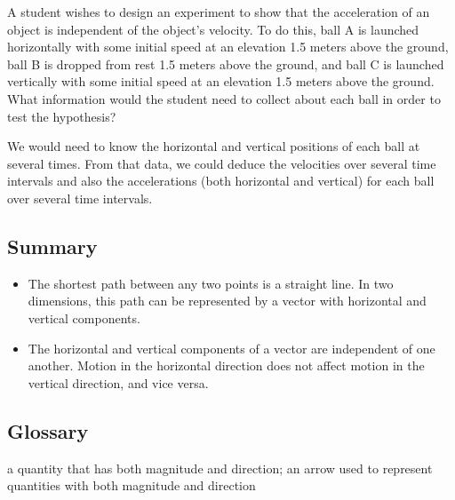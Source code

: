 \documentclass[
]{book}
\providecommand{\tightlist}{%
  \setlength{\itemsep}{0pt}\setlength{\parskip}{0pt}}
\newenvironment{ap-test-prep}{}{}
\begin{document}
\begin{ap-test-prep}
\hypertarget{fs-id1462671}{}
\leavevmode\hypertarget{fs-id2166894}{}%
A student wishes to design an experiment to show that the acceleration
of an object is independent of the object's velocity. To do this, ball
A is launched horizontally with some initial speed at an elevation 1.5
meters above the ground, ball B is dropped from rest 1.5 meters above
the ground, and ball C is launched vertically with some initial speed at
an elevation 1.5 meters above the ground. What information would the
student need to collect about each ball in order to test the hypothesis?

\leavevmode\hypertarget{fs-id1414446}{}%
We would need to know the horizontal and vertical positions of each ball
at several times. From that data, we could deduce the velocities over
several time intervals and also the accelerations (both horizontal and
vertical) for each ball over several time intervals.

\end{ap-test-prep}

\hypertarget{fs-id1165298944131-summary}{}
\hypertarget{summary}{%
\subsection{Summary}\label{summary}}

\begin{itemize}
\tightlist
\item
  \protect\hypertarget{import-auto-id1165296313373}{}{The shortest path between any two points is a straight line. In two
  dimensions, this path can be represented by a vector with horizontal
  and vertical components.}
\item
  \protect\hypertarget{import-auto-id1165296414067}{}{The horizontal and vertical components of a vector are independent
  of one another. Motion in the horizontal direction does not affect
  motion in the vertical direction, and vice
  versa.}
\end{itemize}

\hypertarget{glossary-6}{%
\subsection{Glossary}\label{glossary-6}}

\begin{description}
\tightlist
\item[vector]
a quantity that has both magnitude and direction; an arrow used to
represent quantities with both magnitude and direction
\end{description}
\end{document}
